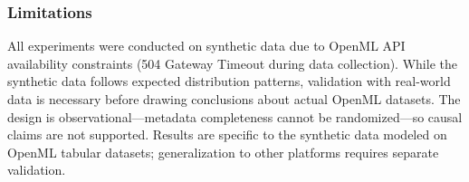 \subsubsection{Limitations}

All experiments were conducted on synthetic data due to OpenML API availability constraints (504 Gateway Timeout during data collection). While the synthetic data follows expected distribution patterns, validation with real-world data is necessary before drawing conclusions about actual OpenML datasets. The design is observational---metadata completeness cannot be randomized---so causal claims are not supported. Results are specific to the synthetic data modeled on OpenML tabular datasets; generalization to other platforms requires separate validation.

